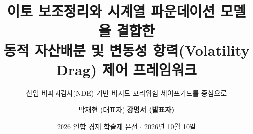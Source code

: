 \documentclass[aspectratio=169,10pt]{beamer}
\title[이토 $\times$ TSFM 동적 자산배분]{이토 보조정리와 시계열 파운데이션 모델을 결합한\\동적 자산배분 및 변동성 항력(Volatility Drag) 제어 프레임워크}
\subtitle{산업 비파괴검사(NDE) 기반 비지도 꼬리위험 세이프가드를 중심으로}
\author[박재현 · 강명서]{박재현 (대표자) \quad \textbf{강명서 (발표자)}}
\institute[서강대학교]{서강대학교 경제대학 경제학과 $\cdot$ 팀 알파퀀트}
\date[2026.10.10]{2026 연합 경제 학술제 본선 $\cdot$ 2026년 10월 10일}
\begin{document}
\begin{frame}[plain]
  \titlepage
\end{frame}








\appendix

\end{document}
